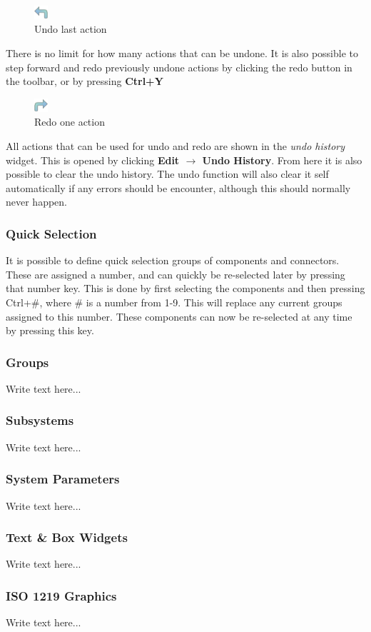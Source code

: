 \begin{figure}
  \includegraphics[width=5mm]
    {../../HopsanGUI/graphics/uiicons/Hopsan-Undo.png}
  \caption*{Undo last action}
\end{figure} 

There is no limit for how many actions that can be undone. It is also possible to step forward and redo previously undone actions by clicking the redo button in the toolbar, or by pressing \textbf{Ctrl+Y}

\begin{figure}
  \includegraphics[width=5mm]
    {../../HopsanGUI/graphics/uiicons/Hopsan-Redo.png}
  \caption*{Redo one action}
\end{figure} 

All actions that can be used for undo and redo are shown in the \textit{undo history} widget. This is opened by clicking \textbf{Edit $\rightarrow$ Undo History}. From here it is also possible to clear the undo history. The undo function will also clear it self automatically if any errors should be encounter, although this should normally never happen.

\subsubsection{Quick Selection}
It is possible to define quick selection groups of components and connectors. These are assigned a number, and can quickly be re-selected later by pressing that number key. This is done by first selecting the components and then pressing Ctrl+\#, where \# is a number from 1-9. This will replace any current groups assigned to this number. These components can now be re-selected at any time by pressing this key. 

\subsubsection{Groups}
Write text here...

\subsubsection{Subsystems}
Write text here...

\subsubsection{System Parameters}
Write text here...

\subsubsection{Text \& Box Widgets}
Write text here...

\subsubsection{ISO 1219 Graphics}
Write text here...

